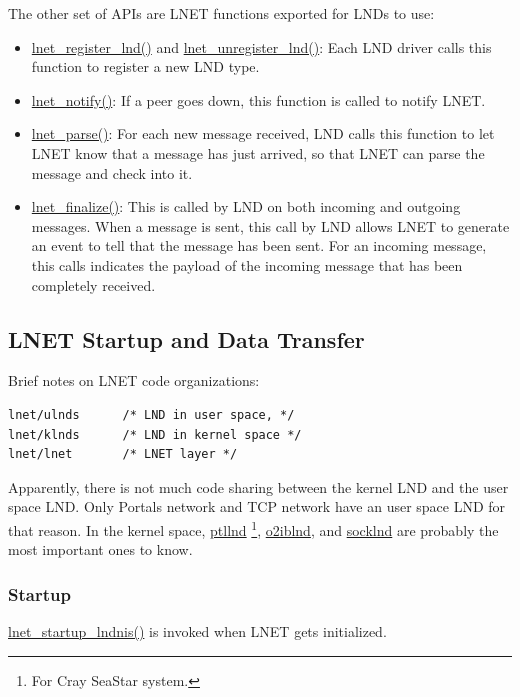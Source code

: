 The other set of APIs are LNET functions exported for LNDs to use:

\begin{itemize}

\item \url{lnet_register_lnd()} and \url{lnet_unregister_lnd()}: Each LND
driver calls this function to register a new LND type.

\item \url{lnet_notify()}: If a peer goes down, this function is called to
notify LNET.

\item \url{lnet_parse()}: For each new message received, LND calls this
function to let LNET know that a message has just arrived, so that LNET can
parse the message and check into it.

\item \url{lnet_finalize()}: This is called by LND on both incoming and
outgoing messages. When a message is sent, this call by LND allows LNET to
generate an event to tell that the message has been sent. For an incoming message,
this calls indicates the payload of the incoming message that has been
completely received.

\end{itemize}

\subsection{LNET Startup and Data Transfer} 

Brief notes on LNET code organizations:

\begin{Verbatim}
lnet/ulnds      /* LND in user space, */
lnet/klnds      /* LND in kernel space */
lnet/lnet       /* LNET layer */
\end{Verbatim}

Apparently, there is not much code sharing between the kernel LND and the user space
LND. Only Portals network and TCP network have an user space LND for that
reason. In the kernel space, \url{ptllnd} \footnote{For Cray SeaStar system.},
\url{o2iblnd}, and \url{socklnd} are probably the most important ones to know. 

\subsubsection{Startup}

\url{lnet_startup_lndnis()} is invoked when LNET gets initialized.

